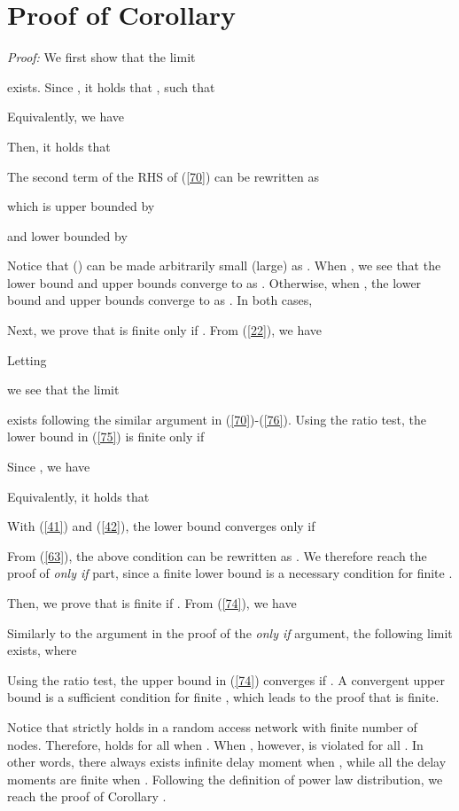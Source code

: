 \documentclass[journal]{IEEEtran}
\begin{document}
\appendices
\section{Proof of Corollary }
\emph{Proof:} We first show that the limit

exists. Since , it holds that ,  such that

Equivalently, we have

Then, it holds that


The second term of the RHS of (\ref{70}) can be rewritten as

which is upper bounded by

and lower bounded by

Notice that  () can be made arbitrarily small (large) as . When , we see that the lower bound and upper bounds converge to  as . Otherwise, when , the lower bound and upper bounds converge to  as . In both cases,


Next, we prove that  is finite only if . From (\ref{22}), we have

Letting

we see that the limit

exists following the similar argument in (\ref{70})-(\ref{76}). Using the ratio test, the lower bound in (\ref{75}) is finite only if

Since , we have

Equivalently, it holds that

With (\ref{41}) and (\ref{42}), the lower bound converges only if

From (\ref{63}), the above condition can be rewritten as . We therefore reach the proof of \emph{only if} part, since a finite lower bound is a necessary condition for finite .

Then, we prove that  is finite if . From (\ref{74}), we have

Similarly to the argument in the proof of the \emph{only if} argument, the following limit exists, where

Using the ratio test, the upper bound in (\ref{74}) converges if . A convergent upper bound is a sufficient condition for finite , which leads to the proof that  is finite.

Notice that  strictly holds in a random access network with finite number of nodes. Therefore,  holds for all  when . When , however,  is violated for all . In other words, there always exists infinite delay moment when , while all the delay moments are finite when . Following the definition of power law distribution, we reach the proof of Corollary . 
\end{document}
